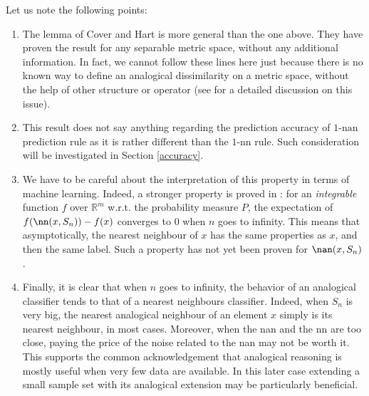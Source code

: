 \documentclass{ecai}
\begin{document}
Let us note the following points:
\begin{enumerate}
\item The lemma of Cover and Hart is more general than the one above. They have
  proven the result for any separable metric space, without any additional
  information. In fact, we cannot follow these lines here just because there is
  no known way to define an analogical dissimilarity on a metric space, without
  the help of other structure or operator (see \cite{MicBayDelJAIR2008} for a
  detailed discussion on this issue).
\item This result does not say anything regarding the prediction accuracy of
  $1\mbox{-nan}$ prediction rule as it is rather different than the
  $1\mbox{-nn}$ rule. Such consideration will be investigated in Section
  \ref{accuracy}.
\item We have to be careful about the interpretation of this property in terms
  of machine learning. Indeed, a stronger property is proved in
  \cite{CovHar1967}: for an {\it integrable} function $f$  over $\mathbb{R}^m$
  w.r.t. the probability measure $P$, the expectation of
  $f(\nn(x,S_n))- f(x)$ converges to 0 when $n$ goes to infinity.
  This means that asymptotically, the nearest neighbour of $x$ has the same
  properties as $x$, and then the same label. Such a property has not yet been
  proven for $\nan(x, S_n)$.
\item Finally, it is clear that when $n$ goes to infinity, the behavior of an
  analogical classifier tends to that of a nearest neighbours classifier.
  Indeed, when $S_n$ is very big, the nearest analogical neighbour of an
  element $x$ simply is its nearest neighbour, in most cases. Moreover, when
  the nan and the nn are too close, paying the price of the noise related to
  the nan may not be worth it. This supports the common acknowledgement that
  analogical reasoning is mostly useful when very few data are available.
    In this later case extending a small sample set with its analogical
    extension may be particularly beneficial.



\end{enumerate}
\end{document}
